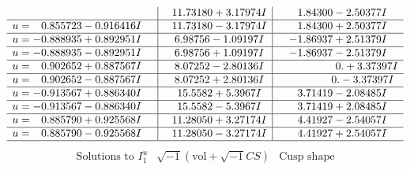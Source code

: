 \documentclass[1p]{elsarticle_modified}
\theoremstyle{definition}
\newcommand{\I}{\sqrt{-1}}
\begin{document}
$$\begin{array}{c|c|c}
 & \phantom{-}11.73180 + 3.17974 I & \phantom{-}1.84300 - 2.50377 I \\ \hline\begin{aligned}
u &= \phantom{-}0.855723 - 0.916416 I\end{aligned}
 & \phantom{-}11.73180 - 3.17974 I & \phantom{-}1.84300 + 2.50377 I \\ \hline\begin{aligned}
u &= -0.888935 + 0.892951 I\end{aligned}
 & \phantom{-}6.98756 - 1.09197 I & -1.86937 + 2.51379 I \\ \hline\begin{aligned}
u &= -0.888935 - 0.892951 I\end{aligned}
 & \phantom{-}6.98756 + 1.09197 I & -1.86937 - 2.51379 I \\ \hline\begin{aligned}
u &= \phantom{-}0.902652 + 0.887567 I\end{aligned}
 & \phantom{-}8.07252 - 2.80136 I & \phantom{-0.000000 -}0. + 3.37397 I \\ \hline\begin{aligned}
u &= \phantom{-}0.902652 - 0.887567 I\end{aligned}
 & \phantom{-}8.07252 + 2.80136 I & \phantom{-0.000000 } 0. - 3.37397 I \\ \hline\begin{aligned}
u &= -0.913567 + 0.886340 I\end{aligned}
 & \phantom{-}15.5582 + 5.3967 I & \phantom{-}3.71419 - 2.08485 I \\ \hline\begin{aligned}
u &= -0.913567 - 0.886340 I\end{aligned}
 & \phantom{-}15.5582 - 5.3967 I & \phantom{-}3.71419 + 2.08485 I \\ \hline\begin{aligned}
u &= \phantom{-}0.885790 + 0.925568 I\end{aligned}
 & \phantom{-}11.28050 + 3.27174 I & \phantom{-}4.41927 - 2.54057 I \\ \hline\begin{aligned}
u &= \phantom{-}0.885790 - 0.925568 I\end{aligned}
 & \phantom{-}11.28050 - 3.27174 I & \phantom{-}4.41927 + 2.54057 I\\
 \hline 
 \end{array}$$\newpage$$\begin{array}{c|c|c}  
\text{Solutions to }I^u_{1}& \I (\text{vol} + \sqrt{-1}CS) & \text{Cusp shape}\\

\end{array}$$
\end{document}
